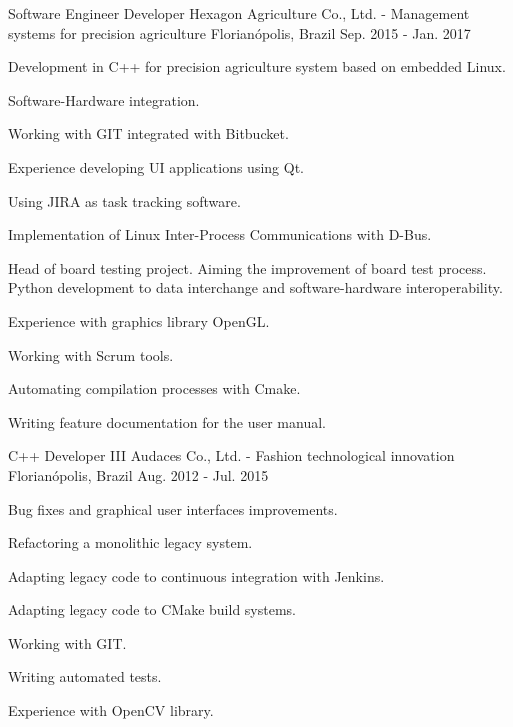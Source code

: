\begin{cventries}
  \cventry
    {Software Engineer Developer} %
    {Hexagon Agriculture Co., Ltd. - Management systems for precision agriculture} %
    {Florianópolis, Brazil} %
    {Sep. 2015 - Jan. 2017} %
    {
      \begin{cvitems} %
        \item {Development in C++ for precision agriculture system based on embedded Linux.}
        \item {Software-Hardware integration.}
        \item {Working with GIT integrated with Bitbucket.}
        \item {Experience developing UI applications using Qt.}
        \item {Using JIRA as task tracking software.}
        \item {Implementation of Linux Inter-Process Communications with D-Bus.}
        \item {Head of board testing project. Aiming the improvement of board test process. \\
        Python development to data interchange and software-hardware interoperability.}
        \item {Experience with graphics library OpenGL.}
        \item {Working with Scrum tools.}
        \item {Automating compilation processes with Cmake.}
        \item {Writing feature documentation for the user manual.}
      \end{cvitems}
    }

  \cventry
    {C++ Developer III} %
    {Audaces Co., Ltd. - Fashion technological innovation} %
    {Florianópolis, Brazil} %
    {Aug. 2012 - Jul. 2015} %
    {
      \begin{cvitems} %
        \item {Bug fixes and graphical user interfaces improvements.}
        \item {Refactoring a monolithic legacy system.}
        \item {Adapting legacy code to continuous integration with Jenkins.}
        \item {Adapting legacy code to CMake build systems.}
        \item {Working with GIT.}
        \item {Writing automated tests.}
        \item {Experience with OpenCV library.}
      \end{cvitems}
    }


\end{cventries}

